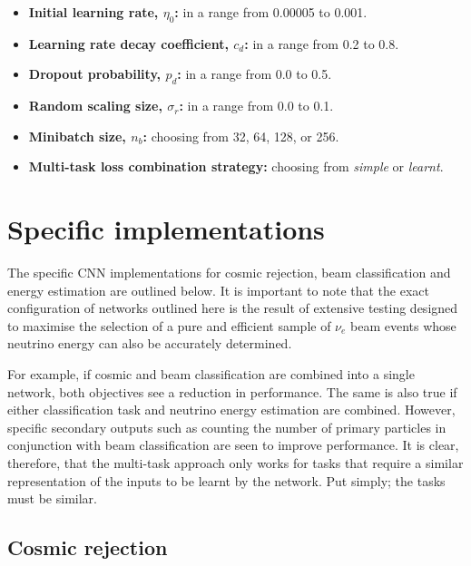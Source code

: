 \begin{itemize}
    \item \textbf{Initial learning rate, $\eta_{0}$:} in a range from 0.00005 to 0.001.
    \item \textbf{Learning rate decay coefficient, $c_{d}$:} in a range from 0.2 to 0.8.
    \item \textbf{Dropout probability, $p_{d}$:} in a range from 0.0 to 0.5.
    \item \textbf{Random scaling size, $\sigma_{r}$:} in a range from 0.0 to 0.1.
    \item \textbf{Minibatch size, $n_{b}$:} choosing from 32, 64, 128, or 256.
    \item \textbf{Multi-task loss combination strategy:} choosing from \emph{simple} or
          \emph{learnt}.
\end{itemize}

\section{Specific implementations} %
\label{sec:cvn_specific} %

The specific CNN implementations for cosmic rejection, beam classification and energy estimation
are outlined below. It is important to note that the exact configuration of networks outlined here
is the result of extensive testing designed to maximise the selection of a pure and efficient
sample of $\nu_{e}$ beam events whose neutrino energy can also be accurately determined.

For example, if cosmic and beam classification are combined into a single network, both objectives
see a reduction in performance. The same is also true if either classification task and neutrino
energy estimation are combined. However, specific secondary outputs such as counting the number of
primary particles in conjunction with beam classification are seen to improve performance. It is
clear, therefore, that the multi-task approach only works for tasks that require a similar
representation of the inputs to be learnt by the network. Put simply; the tasks must be similar.

\subsection{Cosmic rejection} %
\label{sec:cvn_specific_cosmic} %

